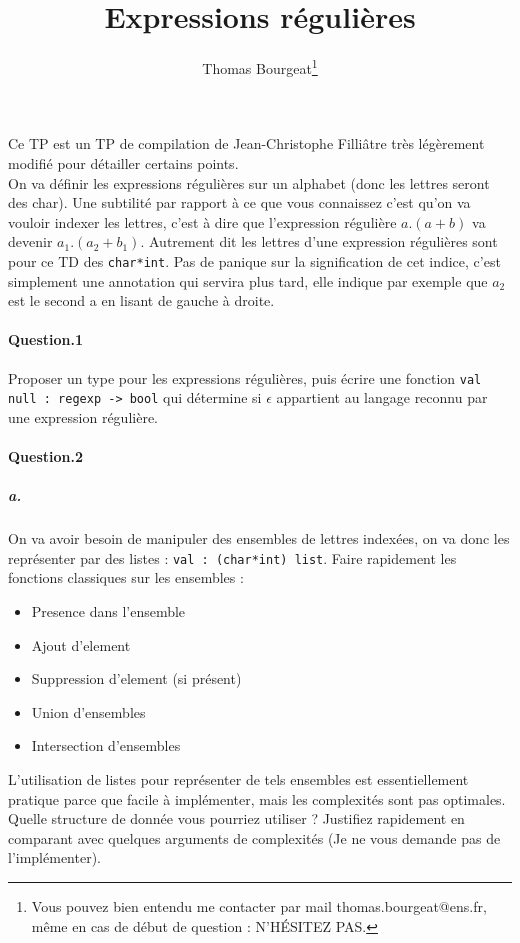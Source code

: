 \documentclass[10pt,a4paper]{article}
\begin{document}
\title{Expressions régulières}
\author{Thomas Bourgeat\footnote{Vous pouvez bien entendu me contacter par mail thomas.bourgeat@ens.fr, même en cas de début de question : N'HÉSITEZ PAS.}}
\maketitle{}
Ce TP est un TP de compilation de Jean-Christophe
Filliâtre  très légèrement modifié pour détailler certains points. 
\\
On va définir les expressions régulières sur un alphabet (donc les lettres
seront des char). Une subtilité par rapport à ce que vous connaissez c'est qu'on
va vouloir indexer les lettres, c'est à dire que l'expression régulière $a.(a+b)$
va devenir $a_1.(a_2+b_1)$. Autrement dit les lettres d'une expression
régulières sont pour ce TD des \texttt{char*int}. Pas de panique sur la
signification de cet indice, c'est simplement une annotation qui servira plus
tard, elle indique par exemple que $a_2$ est le second a en lisant de gauche à
droite.

\paragraph{Question.1\\}
Proposer un type pour les expressions régulières, puis
écrire une fonction \texttt{val null : regexp -> bool} qui détermine si
$\epsilon$ appartient au langage reconnu par une expression régulière.

\paragraph{Question.2\\}

\subparagraph{a.}On va avoir besoin de manipuler des ensembles de lettres indexées, on va donc
les représenter par des listes : \texttt{val : (char*int) list}. Faire rapidement les fonctions classiques sur
les ensembles :
\begin{itemize}
\item Presence dans l'ensemble
\item Ajout d'element
\item Suppression d'element (si présent)
\item Union d'ensembles
\item Intersection d'ensembles
\end{itemize}
L'utilisation de listes pour représenter de tels ensembles est essentiellement
pratique parce que facile à implémenter, mais les complexités sont pas
optimales.
Quelle structure de donnée vous pourriez utiliser ? Justifiez rapidement en
comparant avec
quelques arguments de complexités  (Je ne vous demande pas de l'implémenter).
\\
\end{document}
